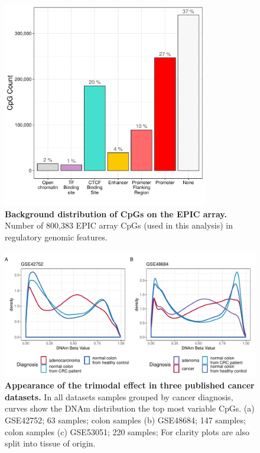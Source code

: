 \documentclass[a4paper]{article}
\begin{document}
\begin{figure}
\includegraphics[width=0.8\textwidth]{../figs/EPIC_distribution_reg_CpGs.pdf}
\caption{\textbf{Background distribution of CpGs on the EPIC array.} Number of 800,383 EPIC array CpGs (used in this analysis) in regulatory genomic features.}
\end{figure}

\begin{figure}
\includegraphics[width=1\textwidth]{../figs/cancer_public_same_variable_cpg_num.pdf}
\caption{\textbf{Appearance of the trimodal effect in three published cancer datasets.} In all datasets samples grouped by cancer diagnosis, curves show the DNAm distribution the top most variable CpGs. (a) GSE42752; 63 samples; colon samples (b) GSE48684; 147 samples; colon samples (c) GSE53051; 220 samples; For clarity plots are also split into tissue of origin. }
\end{figure}
\end{document}
